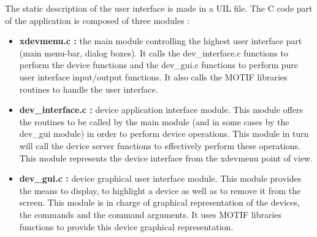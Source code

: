 The static description of the user interface is made in a UIL file. The C code
part of the application is composed of three modules :
\begin{itemize}
\item
{\bf xdevmenu.c : } the main module controlling the highest user interface part
(main menu-bar, dialog boxes). It calls the dev\_interface.c functions to
perform the device functions and the dev\_gui.c functions to perform pure user
interface input/output functions. It also calls the MOTIF libraries routines to
handle the user interface.
\item
{\bf dev\_interface.c : } device application interface module. This module
offers the routines to be called by the main module (and in some cases by the
dev\_gui module) in order to perform device operations.
This module in turn will call the device server functions to effectively 
perform these operations. This module represents the device
interface from the xdevmenu point of view.
\item
{\bf dev\_gui.c : } device graphical user interface module. This module provides
the means to display, to highlight a device as well as to remove it from the
screen. This module is in charge of graphical representation of the devices,
the commands and the command arguments.
It uses MOTIF libraries functions to provide this device graphical
representation.
\end{itemize}
